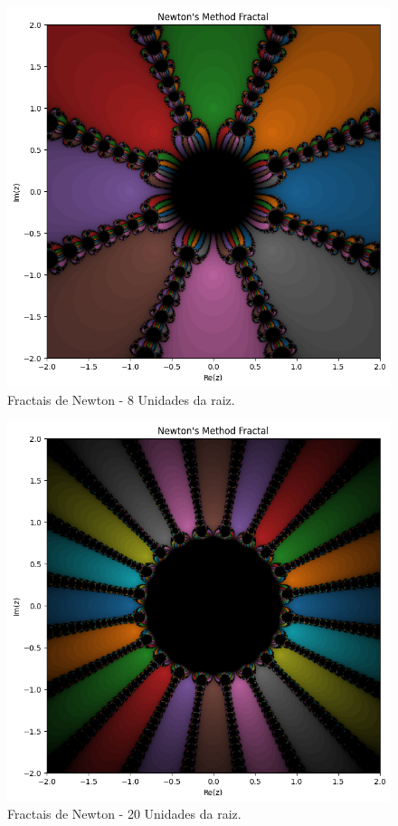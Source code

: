 \begin{figure}[H]
    \centering
    \includegraphics[width=1\textwidth]{Imagens/nr2d_fractals/unit_roots/unitroot8.png}
    \caption{Fractais de Newton - 8 Unidades da raiz.}
    \label{fig:fractaisnr_unitroots8}
\end{figure}


\begin{figure}[H]
    \centering
    \includegraphics[width=1\textwidth]{Imagens/nr2d_fractals/unit_roots/unitroot20.png}
    \caption{Fractais de Newton - 20 Unidades da raiz.}
    \label{fig:fractaisnr_unitroots20}
\end{figure}

